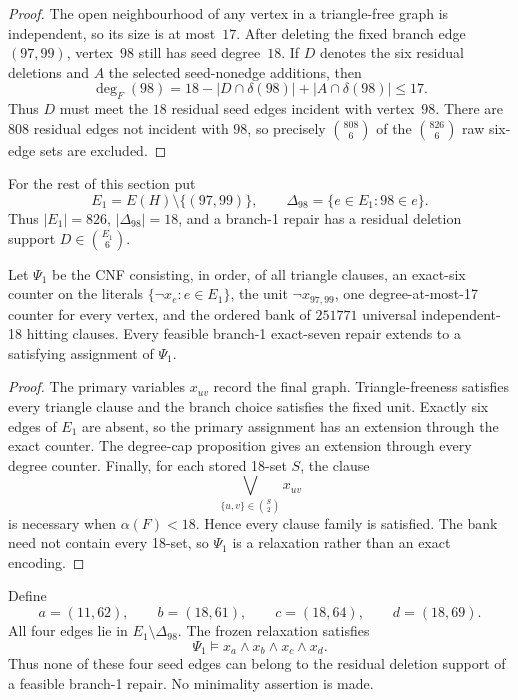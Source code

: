 \begin{proof}
The open neighbourhood of any vertex in a triangle-free graph is independent,
so its size is at most~\(17\).  After deleting the fixed branch edge
\((97,99)\), vertex~\(98\) still has seed degree~\(18\).  If \(D\) denotes
the six residual deletions and \(A\) the selected seed-nonedge additions, then
\[
  \deg_F(98)
  =18-|D\cap\delta(98)|+|A\cap\delta(98)|\le17.
\]
Thus \(D\) must meet the \(18\) residual seed edges incident with vertex~\(98\).
There are \(808\) residual edges not incident with \(98\), so precisely
\(\binom{808}{6}\) of the \(\binom{826}{6}\) raw six-edge sets are excluded.
\end{proof}

For the rest of this section put
\[
 E_1=E(H)\setminus\{(97,99)\},\qquad
 \Delta_{98}=\{e\in E_1:98\in e\}.
\]
Thus \(|E_1|=826\), \(|\Delta_{98}|=18\), and a branch-1 repair has a
residual deletion support \(D\in\binom{E_1}{6}\).

\begin{lemma}
\label{lem:branch1-common-relaxation}
Let \(\Psi_1\) be the CNF consisting, in order, of all triangle clauses, an
exact-six counter on the literals \(\{\neg x_e:e\in E_1\}\), the unit
\(\neg x_{97,99}\), one degree-at-most-17 counter for every vertex, and the
ordered bank of \(251771\) universal independent-18 hitting clauses.  Every
feasible branch-1 exact-seven repair extends to a satisfying assignment of
\(\Psi_1\).
\end{lemma}

\begin{proof}
The primary variables \(x_{uv}\) record the final graph.  Triangle-freeness
satisfies every triangle clause and the branch choice satisfies the fixed
unit.  Exactly six edges of \(E_1\) are absent, so the primary assignment has
an extension through the exact counter.  The degree-cap proposition gives an
extension through every degree counter.  Finally, for each stored 18-set
\(S\), the clause
\[
 \bigvee_{\{u,v\}\in\binom S2}x_{uv}
\]
is necessary when \(\alpha(F)<18\).  Hence every clause family is satisfied.
The bank need not contain every 18-set, so \(\Psi_1\) is a relaxation rather
than an exact encoding.
\end{proof}

\begin{proposition}
\label{prop:branch1-singleton-entailments}
Define
\[
 a=(11,62),\qquad b=(18,61),\qquad
 c=(18,64),\qquad d=(18,69).
\]
All four edges lie in \(E_1\setminus\Delta_{98}\).  The frozen relaxation
satisfies
\[
 \Psi_1\models x_a\wedge x_b\wedge x_c\wedge x_d.
\]
Thus none of these four seed edges can belong to the residual deletion support
of a feasible branch-1 repair.  No minimality assertion is made.
\end{proposition}

